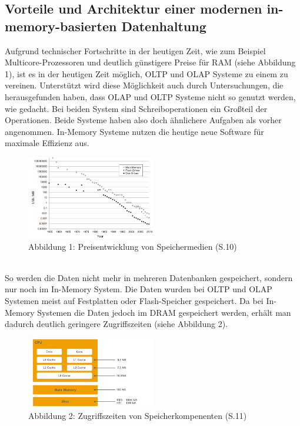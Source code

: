 \subsection{Vorteile und Architektur einer modernen in-memory-basierten Datenhaltung}
Aufgrund technischer Fortschritte in der heutigen Zeit, wie zum Beispiel Multicore-Prozessoren und deutlich günstigere Preise für RAM (siehe Abbildung 1),
ist es in der heutigen Zeit möglich, OLTP und OLAP Systeme zu einem zu vereinen.
Unterstützt wird diese Möglichkeit auch durch Untersuchungen, die herausgefunden haben, dass OLAP und OLTP Systeme nicht so genutzt werden, wie gedacht. Bei beiden System sind Schreiboperationen ein Großteil der Operationen. Beide Systeme haben also doch ähnlichere Aufgaben als vorher angenommen. In-Memory Systeme nutzen die heutige neue Software für maximale Effizienz aus.
\begin{figure}[ht]
  \begin{center}
  \includegraphics[width=0.5\textwidth]{images/mainflashdisk.png}
  \end{center}
  \caption{Abbildung 1: Preisentwicklung von Speichermedien (\cite{hp}S.10)}
  \label{fig_1}
\end{figure} 
\\
So werden die Daten nicht mehr in mehreren Datenbanken gespeichert, sondern nur noch im In-Memory System. Die Daten wurden bei OLTP und OLAP Systemen meist auf Festplatten oder Flash-Speicher gespeichert. Da bei In-Memory Systemen die Daten jedoch im DRAM gespeichert werden, erhält man dadurch deutlich geringere Zugriffszeiten (siehe Abbildung 2).
\\
\begin{figure}[ht]
  \begin{center}
  \includegraphics[width=0.5\textwidth]{images/cpu.png}
  \end{center}
  \caption{Abbildung 2: Zugriffszeiten von Speicherkompenenten (\cite{sap}S.11)}
  \label{fig_2}
\end{figure} 
